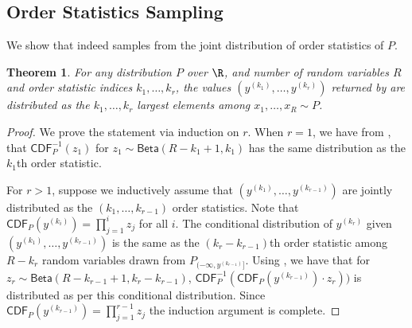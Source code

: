 \documentclass[twoside]{article}
\newtheorem{theorem}{Theorem}[section]
\theoremstyle{definition}
\newcommand{\CDF}{\mathsf{CDF}}
\newcommand{\Beta}{\mathsf{Beta}}
\begin{document}
\subsection{Order Statistics Sampling}\label{subapp:order-stats}

We show that  indeed samples from the joint distribution of order statistics of $P$.
\begin{theorem}\label{thm:order-sampling}
For any distribution $P$ over $\R$, and number of random variables $R$ and order statistic indices $k_1, \ldots, k_r$, the values $(y^{(k_1)}, \ldots, y^{(k_r)})$ returned by  are distributed as the $k_1, \ldots, k_r$ largest elements among $x_1, \ldots, x_R \sim P$.
\end{theorem}
\begin{proof}
We prove the statement via induction on $r$. When $r = 1$, we have from , that $\CDF_P^{-1}(z_1)$ for $z_1 \sim \Beta(R-k_1+1, k_1)$ has the same distribution as the $k_1$th order statistic.

For $r > 1$, suppose we inductively assume that $(y^{(k_1)}, \ldots, y^{(k_{r-1})})$ are jointly distributed as the $(k_1, \ldots, k_{r-1})$ order statistics. Note that $\CDF_P(y^{(k_i)}) = \prod_{j=1}^i z_j$ for all $i$. The conditional distribution of $y^{(k_r)}$ given $(y^{(k_1)}, \ldots, y^{(k_{r-1})})$ is the same as the $(k_r - k_{r-1})$th order statistic among $R - k_r$ random variables drawn from $P_{(-\infty, y^{(k_{r-1})}]}$. Using , we have that for $z_r \sim \Beta(R - k_{r-1} + 1, k_r - k_{r-1})$, $\CDF_P^{-1}(\CDF_P(y^{(k_{r-1})}) \cdot z_r))$ is distributed as per this conditional distribution. Since $\CDF_P(y^{(k_{r-1})}) = \prod_{j=1}^{r-1} z_j$ the induction argument is complete.
\end{proof}
\end{document}
